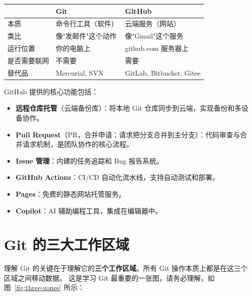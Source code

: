\documentclass[12pt,a4paper,openany]{ctexbook}
\begin{document}
\begin{infobox}[boxsep=2mm, left=6mm, right=6mm]
\label{tab:git-vs-github}

{\renewcommand{\arraystretch}{1.3}\setlength{\tabcolsep}{6pt}\begin{tabularx}{\linewidth}{l >{\raggedright\arraybackslash}X >{\raggedright\arraybackslash}X}
\toprule
& \textbf{Git} & \textbf{GitHub} \\
\midrule
本质 & 命令行工具（软件） & 云端服务（网站） \\
类比 & 像"发邮件"这个动作 & 像"Gmail"这个服务 \\
运行位置 & 你的电脑上 & github.com 服务器上 \\
是否需要联网 & 不需要 & 需要 \\
替代品 & Mercurial, SVN & GitLab, Bitbucket, Gitee \\
\bottomrule
\end{tabularx}}
\end{infobox}

GitHub 提供的核心功能包括：

\begin{itemize}[leftmargin=2em]
  \item \textbf{远程仓库托管}（云端备份库）：将本地 Git 仓库同步到云端，实现备份和多设备协作。
  \item \textbf{Pull Request}（PR，合并申请：请求把分支合并到主分支）：代码审查与合并请求机制，是团队协作的核心流程。
  \item \textbf{Issue 管理}：内建的任务追踪和 Bug 报告系统。
  \item \textbf{GitHub Actions}：CI/CD 自动化流水线，支持自动测试和部署。
  \item \textbf{Pages}：免费的静态网站托管服务。
  \item \textbf{Copilot}：AI 辅助编程工具，集成在编辑器中。
\end{itemize}

\section{Git 的三大工作区域}

理解 Git 的关键在于理解它的\textbf{三个工作区域}。所有 Git 操作本质上都是在这三个区域之间移动数据。
这是学习 Git 最重要的一张图，请务必理解，如图~\ref{fig:three-zones} 所示：
\end{document}
